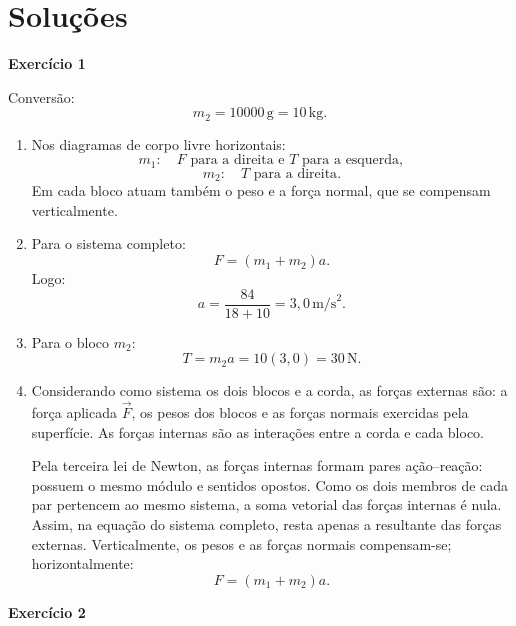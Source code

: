 \documentclass[12pt]{article}
\begin{document}
	\newpage

	\section*{Soluções}

	\textbf{Exercício 1}

	Conversão:
	\[
	m_2=10000\,\text{g}=10\,\text{kg}.
	\]

	\begin{enumerate}[label=\textbf{\alph*)}]
		\item Nos diagramas de corpo livre horizontais:
		\[
		m_1:\quad F \text{ para a direita e } T \text{ para a esquerda},
		\]
		\[
		m_2:\quad T \text{ para a direita}.
		\]
		Em cada bloco atuam também o peso e a força normal, que se compensam verticalmente.

		\item Para o sistema completo:
		\[
		F=(m_1+m_2)a.
		\]
		Logo:
		\[
		a=\frac{84}{18+10}
		=3,0\,\text{m/s}^2.
		\]

		\item Para o bloco $m_2$:
		\[
		T=m_2a
		=10(3,0)
		=30\,\text{N}.
		\]

		\item Considerando como sistema os dois blocos e a corda, as forças externas são:
		a força aplicada $\vec{F}$, os pesos dos blocos e as forças normais exercidas pela
		superfície. As forças internas são as interações entre a corda e cada bloco.

		Pela terceira lei de Newton, as forças internas formam pares ação--reação:
		possuem o mesmo módulo e sentidos opostos. Como os dois membros de cada par pertencem
		ao mesmo sistema, a soma vetorial das forças internas é nula. Assim, na equação do
		sistema completo, resta apenas a resultante das forças externas. Verticalmente, os
		pesos e as forças normais compensam-se; horizontalmente:
		\[
		F=(m_1+m_2)a.
		\]
	\end{enumerate}

	\vspace{0.2cm}

	\textbf{Exercício 2}
\end{document}
